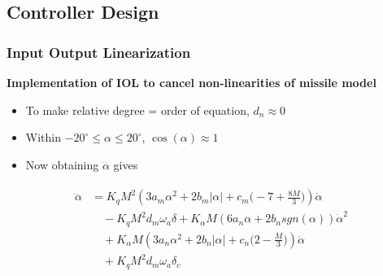 \documentclass[table,10pt,red]{beamer}	%
\begin{document}
\subsection{Controller Design} %
\begin{frame}
	\frametitle{Input Output Linearization}
	\textbf{Implementation of IOL to cancel non-linearities of missile model} 
	\begin{itemize}
		\item To make relative degree = order of equation, $d_n \approx 0$
		\item Within $-20^\circ\le \alpha \le20^\circ$, $\cos(\alpha) \approx 1$
		\item Now obtaining $\dddot{\alpha}$ gives
	\end{itemize}

\begin{eqnarray*}
\begin{aligned}
	\dddot{\alpha}&=K_q M^2(3a_m\alpha^2+2b_m|\alpha|+c_m\Big(-7+\frac{8M}{3}\Big))\dot{\alpha}\\ 
	&\quad - K_q M^2d_m\omega_a\delta+K_{\alpha}M(6a_n\alpha+2b_n sgn(\alpha))\dot{\alpha}^2\\ 
	&\quad + K_\alpha M(3a_n\alpha^2+2b_n|\alpha|+c_n\Big(2-\frac{M}{3}\Big))\ddot{\alpha}\\ 
	&\quad + K_q M^2d_m\omega_a\delta_c \label{a3dot}
\end{aligned}
\label{eq4}
\end{eqnarray*}

\end{frame}
\end{document}
